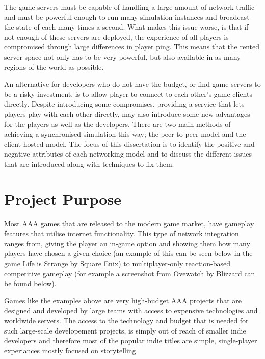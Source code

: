 The game servers must be capable of handling a large amount of network traffic and must be powerful enough to run many simulation instances and broadcast the state of each many times a second. What makes this issue worse, is that if not enough of these servers are deployed, the experience of all players is compromised through large differences in player ping. This means that the rented server space not only has to be very powerful, but also available in as many regions of the world as possible.

An alternative for developers who do not have the budget, or find game servers to be a risky investment, is to allow player to connect to each other's game clients directly. Despite introducing some compromises, providing a service that lets players play with each other directly, may also introduce some new advantages for the players as well as the developers. There are two main methods of achieving a synchronised simulation this way; the peer to peer model and the client hosted model. The focus of this dissertation is to identify the positive and negative attributes of each networking model and to discuss the different issues that are introduced along with techniques to fix them.


\section{Project Purpose}
Most AAA games that are released to the modern game market, have gameplay features that utilise internet functionality. This type of network integration ranges from, giving the player an in-game option and showing them how many players have chosen a given choice (an example of this can be seen below in the game Life is Strange by Square Enix) to multiplayer-only reaction-based competitive gameplay (for example a screenshot from Ovewatch by Blizzard can be found below).

\begin{figure}[!h]
  \centering
{}
  \qquad
\end{figure}

Games like the examples above are very high-budget AAA projects that are designed and developed by large teams with access to expensive technologies and worldwide servers. The access to the technology and budget that is needed for such large-scale developement projects, is simply out of reach of smaller indie developers and therefore most of the popular indie titles are simple, single-player experiances mostly focused on storytelling.

